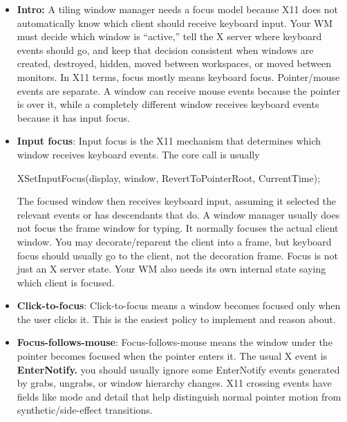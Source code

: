 \documentclass{report}
\begin{document}
    \pagebreak 
    \begin{itemize}
        \item \textbf{Intro:} A tiling window manager needs a focus model because X11 does not automatically know which client should receive keyboard input. Your WM must decide which window is “active,” tell the X server where keyboard events should go, and keep that decision consistent when windows are created, destroyed, hidden, moved between workspaces, or moved between monitors.
            \bigbreak \noindent 
            In X11 terms, focus mostly means keyboard focus. Pointer/mouse events are separate. A window can receive mouse events because the pointer is over it, while a completely different window receives keyboard events because it has input focus.        
        \item \textbf{Input focus}: Input focus is the X11 mechanism that determines which window receives keyboard events.
            \bigbreak \noindent 
            The core call is usually
            \bigbreak \noindent 
            \begin{cppcode}
                XSetInputFocus(display, window, RevertToPointerRoot, CurrentTime);
            \end{cppcode}
            \bigbreak \noindent 
            The focused window then receives keyboard input, assuming it selected the relevant events or has descendants that do.
            \bigbreak \noindent 
            A window manager usually does not focus the frame window for typing. It normally focuses the actual client window.
            \bigbreak \noindent 
            You may decorate/reparent the client into a frame, but keyboard focus should usually go to the client, not the decoration frame.
            \bigbreak \noindent 
            Focus is not just an X server state. Your WM also needs its own internal state saying which client is focused.
        \item \textbf{Click-to-focus}: Click-to-focus means a window becomes focused only when the user clicks it.
            \bigbreak \noindent 
            This is the easiest policy to implement and reason about.
        \item \textbf{Focus-follows-mouse}: Focus-follows-mouse means the window under the pointer becomes focused when the pointer enters it. The usual X event is \textbf{EnterNotify.}
            \bigbreak \noindent 
            you should usually ignore some EnterNotify events generated by grabs, ungrabs, or window hierarchy changes. X11 crossing events have fields like mode and detail that help distinguish normal pointer motion from synthetic/side-effect transitions.

\end{itemize}
\end{document}
